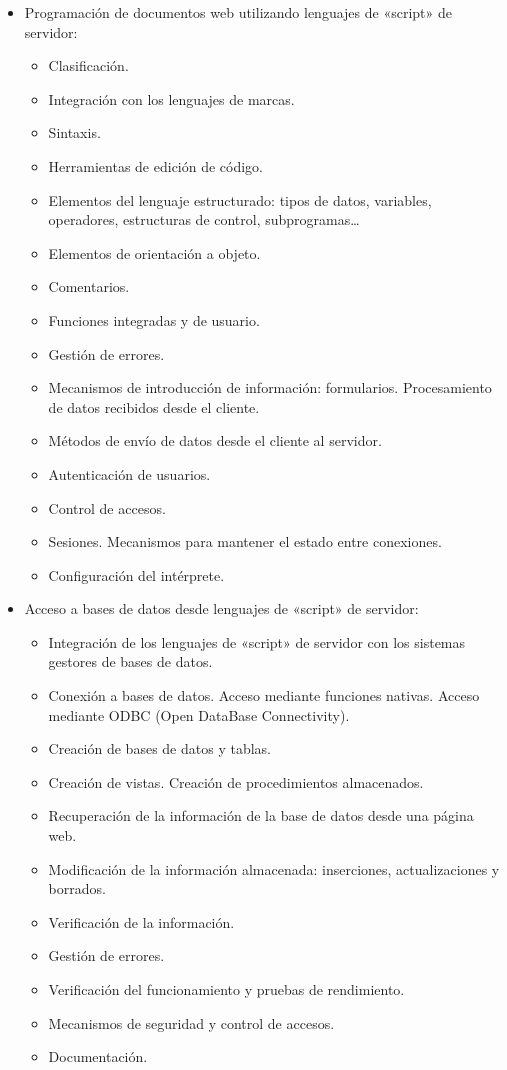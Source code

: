 \documentclass[a4paper]{article}
\begin{document}
\begin{itemize}
\item Programación de documentos web utilizando lenguajes de «script» de servidor:
\begin{itemize}
\item Clasificación.
\item Integración con los lenguajes de marcas.
\item Sintaxis.
\item Herramientas de edición de código.
\item Elementos del lenguaje estructurado: tipos de datos, variables, operadores, estructuras de control, subprogramas\ldots{}
\item Elementos de orientación a objeto.
\item Comentarios.
\item Funciones integradas y de usuario.
\item Gestión de errores.
\item Mecanismos de introducción de información: formularios. Procesamiento de datos recibidos desde el cliente.
\item Métodos de envío de datos desde el cliente al servidor.
\item Autenticación de usuarios.
\item Control de accesos.
\item Sesiones. Mecanismos para mantener el estado entre conexiones.
\item Configuración del intérprete.
\end{itemize}
\end{itemize}
\begin{itemize}
\item Acceso a bases de datos desde lenguajes de «script» de servidor:
\begin{itemize}
\item Integración de los lenguajes de «script» de servidor con los sistemas gestores de bases de datos.
\item Conexión a bases de datos. Acceso mediante funciones nativas. Acceso mediante ODBC (Open DataBase Connectivity).
\item Creación de bases de datos y tablas.
\item Creación de vistas. Creación de procedimientos almacenados.
\item Recuperación de la información de la base de datos desde una página web.
\item Modificación de la información almacenada: inserciones, actualizaciones y borrados.
\item Verificación de la información.
\item Gestión de errores.
\item Verificación del funcionamiento y pruebas de rendimiento.
\item Mecanismos de seguridad y control de accesos.
\item Documentación.
\end{itemize}
\end{itemize}
\end{document}
